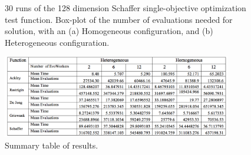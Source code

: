 \documentclass{llncs}
\begin{document}
\begin{figure}[b]
    \centering
 

    \caption{30 runs of the 128 dimension Schaffer single-objective optimization test function. 
    Box-plot of the number of evaluations needed for solution, with an (a) Homogeneous configuration, and (b) Heterogeneous configuration.}
    \label{fig:schaffer-evals}
\end{figure}

\begin{figure}[t]
    \centering
        \includegraphics[width=10cm]{img/table.png}
    \caption{Summary table of results. }
    \label{fig:summary}
\end{figure}
\end{document}
